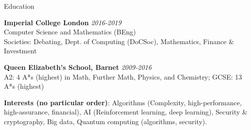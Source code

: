 \documentclass[10pt]{resume} %
\begin{document}

\begin{rSection}{Education}

{\bf Imperial College London} \hfill {\em 2016-2019} \\ 
Computer Science and Mathematics (BEng)\smallskip\\
Societies: Debating, Dept. of Computing (DoCSoc), Mathematics, Finance \& Investment

{\bf Queen Elizabeth's School, Barnet} \hfill {\em 2009-2016} \\ 
A2: 4 A*s (highest) in Math, Further Math, Physics, and Chemistry; GCSE: 13 A*s (highest)


\textbf{Interests (no particular order)}:
  Algorithms (Complexity, high-performance, high-assurance, financial),
  AI (Reinforcement learning, deep learning),
  Security \& cryptography,
  Big data,
  Quantum computing (algorithms, security).

\end{rSection}

\end{document}
